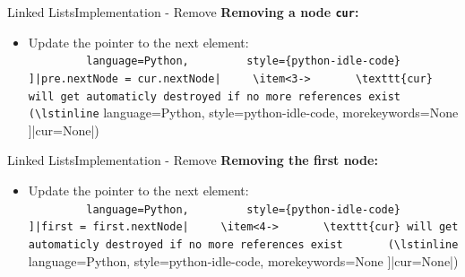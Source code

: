 
\begin{frame}{Linked Lists}{Implementation - Remove}
  \textbf{Removing a node \texttt{cur}:}
  \begin{itemize}
    \item<2->
      Update the pointer to the next element:\\
      \lstinline[
        language=Python,
        style={python-idle-code}
      ]|pre.nextNode = cur.nextNode|
    \item<3->
      \texttt{cur} will get automaticly destroyed if no more references exist
      (\lstinline[
        language=Python,
        style={python-idle-code},
        morekeywords={None}
      ]|cur=None|)
  \end{itemize}
  \begin{flushleft}
    
  \end{flushleft}
\end{frame}




\begin{frame}{Linked Lists}{Implementation - Remove}
  \textbf{Removing the first node:}
    \begin{flushleft}
    
  \end{flushleft}
  \begin{itemize}
    \item<3->
      Update the pointer to the next element:\\
      \lstinline[
        language=Python,
        style={python-idle-code}
      ]|first = first.nextNode|
    \item<4->
      \texttt{cur} will get automaticly destroyed if no more references exist
      (\lstinline[
        language=Python,
        style={python-idle-code},
        morekeywords={None}
      ]|cur=None|)
  \end{itemize}
  \begin{flushright}
    
  \end{flushright}
\end{frame}

